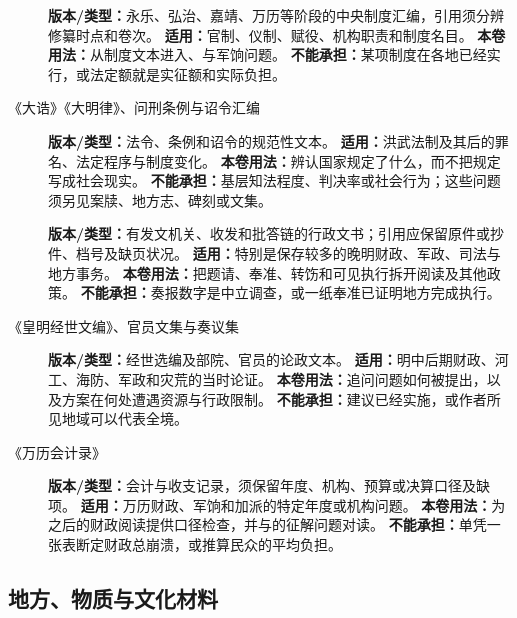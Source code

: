 \begin{description}
  \item[] \textbf{版本/类型：}永乐、弘治、嘉靖、万历等阶段的中央制度汇编，引用须分辨修纂时点和卷次。 \textbf{适用：}官制、仪制、赋役、机构职责和制度名目。 \textbf{本卷用法：}从制度文本进入、与军饷问题。 \textbf{不能承担：}某项制度在各地已经实行，或法定额就是实征额和实际负担。
  \item[《大诰》《大明律》、问刑条例与诏令汇编] \textbf{版本/类型：}法令、条例和诏令的规范性文本。 \textbf{适用：}洪武法制及其后的罪名、法定程序与制度变化。 \textbf{本卷用法：}辨认国家规定了什么，而不把规定写成社会现实。 \textbf{不能承担：}基层知法程度、判决率或社会行为；这些问题须另见案牍、地方志、碑刻或文集。
  \item[] \textbf{版本/类型：}有发文机关、收发和批答链的行政文书；引用应保留原件或抄件、档号及缺页状况。 \textbf{适用：}特别是保存较多的晚明财政、军政、司法与地方事务。 \textbf{本卷用法：}把题请、奉准、转饬和可见执行拆开阅读及其他政策。 \textbf{不能承担：}奏报数字是中立调查，或一纸奉准已证明地方完成执行。
  \item[《皇明经世文编》、官员文集与奏议集] \textbf{版本/类型：}经世选编及部院、官员的论政文本。 \textbf{适用：}明中后期财政、河工、海防、军政和灾荒的当时论证。 \textbf{本卷用法：}追问问题如何被提出，以及方案在何处遭遇资源与行政限制。 \textbf{不能承担：}建议已经实施，或作者所见地域可以代表全境。
  \item[《万历会计录》] \textbf{版本/类型：}会计与收支记录，须保留年度、机构、预算或决算口径及缺项。 \textbf{适用：}万历财政、军饷和加派的特定年度或机构问题。 \textbf{本卷用法：}为之后的财政阅读提供口径检查，并与的征解问题对读。 \textbf{不能承担：}单凭一张表断定财政总崩溃，或推算民众的平均负担。
\end{description}

\subsection{地方、物质与文化材料}

